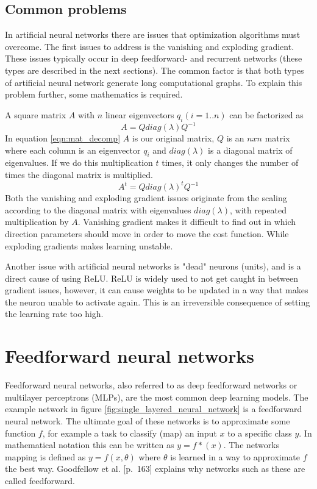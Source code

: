 \subsection{Common problems}
\label{vanishing-gradient}
\label{exploding-gradient}
\label{dead-neurons}
In artificial neural networks there are issues that optimization algorithms must overcome. The first issues to address is the vanishing and exploding gradient. These issues typically occur in deep feedforward- and recurrent networks (these types are described in the next sections). The common factor is that both types of artificial neural network generate long computational graphs. To explain this problem further, some mathematics is required.

A square matrix $A$ with $n$ linear eigenvectors $q_i (i=1..n)$ can be factorized as
\begin{equation} \label{eqn:mat_decomp}
    A=Q diag(\lambda) Q^{-1} 
\end{equation}
In equation \ref{eqn:mat_decomp} $A$ is our original matrix, $Q$ is an $nxn$ matrix where each column is an eigenvector $q_i$ and $diag(\lambda)$ is a diagonal matrix of eigenvalues. If we do this multiplication $t$ times, it only changes the number of times the diagonal matrix is multiplied. \cite{weisstein_eigen_????}
\begin{equation} \label{eqn:mat_decomp_t}
    A^{t} = Q diag(\lambda)^{t} Q^{-1}
\end{equation}
Both the vanishing and exploding gradient issues originate from the scaling according to the diagonal matrix with eigenvalues $diag(\lambda)$, with repeated multiplication by $A$. Vanishing gradient makes it difficult to find out in which direction parameters should move in order to move the cost function. While exploding gradients makes learning unstable. \cite{goodfellow_deep_2016}

Another issue with artificial neural networks is "dead" neurons (units), and is a direct cause of using ReLU. ReLU is widely used to not get caught in between gradient issues, however, it can cause weights to be updated in a way that makes the neuron unable to activate again. This is an irreversible consequence of setting the learning rate too high.\cite{_cs231n_????}

\section{Feedforward neural networks}
% 
Feedforward neural networks, also referred to as deep feedforward networks or multilayer perceptrons (MLPs), are the most common deep learning models. The example network in figure \ref{fig:single_layered_neural_network} is a feedforward neural network. The ultimate goal of these networks is to approximate some function $f$, for example a task to classify (map) an input $x$ to a specific class $y$. In mathematical notation this can be written as $y = f*(x)$. The networks mapping is defined as $y = f(x,\theta)$ where $\theta$ is learned in a way to approximate $f$ the best way. Goodfellow et al. \cite{goodfellow_deep_2016}[p.~163] explains why networks such as these are called feedforward.

